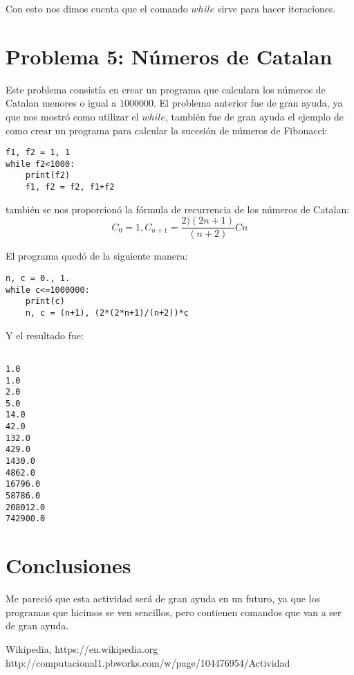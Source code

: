 \documentclass[12pt,letterpaper]{article}
\begin{document}
Con esto nos dimos cuenta que el comando $while$ sirve para hacer iteraciones.

\section{Problema 5: Números de Catalan}

Este problema consistía en crear un programa que calculara los números de Catalan menores o igual a $1000000$. El problema anterior fue de gran ayuda, ya que nos mostró como utilizar el $while$, también fue de gran ayuda el ejemplo de como crear un programa para calcular la sucesión de números de Fibonacci: 

\begin{verbatim}
f1, f2 = 1, 1
while f2<1000:
    print(f2)
    f1, f2 = f2, f1+f2
\end{verbatim}
también se nos proporcionó la fórmula de recurrencia de los números de Catalan: $$ C_0 =1, C_{n+1} = \frac{2)(2n+1)}{(n+2)} Cn  $$

El programa quedó de la siguiente manera:

\begin{verbatim}
n, c = 0., 1.
while c<=1000000:
    print(c)
    n, c = (n+1), (2*(2*n+1)/(n+2))*c
\end{verbatim}

Y el resultado fue:

\begin{verbatim}

1.0
1.0
2.0
5.0
14.0
42.0
132.0
429.0
1430.0
4862.0
16796.0
58786.0
208012.0
742900.0

\end{verbatim}

\section*{Conclusiones}

Me pareció que esta actividad será de gran ayuda en un futuro, ya que los programas que hicimos se ven sencillos, pero contienen comandos que van a ser de gran ayuda. 


\begin{thebibliography}{widestlabel}
 Wikipedia, https://en.wikipedia.org
 http://computacional1.pbworks.com/w/page/104476954/Actividad%
\end{thebibliography}
\end{document}
